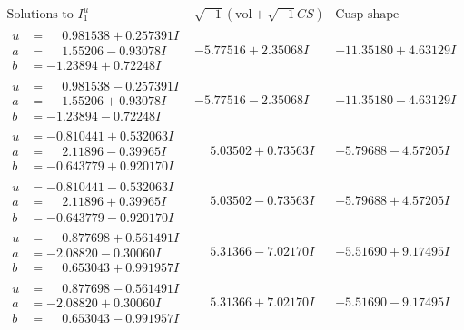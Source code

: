 \documentclass[1p]{elsarticle_modified}
\theoremstyle{definition}
\newcommand{\I}{\sqrt{-1}}
\begin{document}
$$\begin{array}{c|c|c}  
\text{Solutions to }I^u_{1}& \I (\text{vol} + \sqrt{-1}CS) & \text{Cusp shape}\\
 \hline 
\begin{aligned}
u &= \phantom{-}0.981538 + 0.257391 I \\
a &= \phantom{-}1.55206 - 0.93078 I \\
b &= -1.23894 + 0.72248 I\end{aligned}
 & -5.77516 + 2.35068 I & -11.35180 + 4.63129 I \\ \hline\begin{aligned}
u &= \phantom{-}0.981538 - 0.257391 I \\
a &= \phantom{-}1.55206 + 0.93078 I \\
b &= -1.23894 - 0.72248 I\end{aligned}
 & -5.77516 - 2.35068 I & -11.35180 - 4.63129 I \\ \hline\begin{aligned}
u &= -0.810441 + 0.532063 I \\
a &= \phantom{-}2.11896 - 0.39965 I \\
b &= -0.643779 + 0.920170 I\end{aligned}
 & \phantom{-}5.03502 + 0.73563 I & -5.79688 - 4.57205 I \\ \hline\begin{aligned}
u &= -0.810441 - 0.532063 I \\
a &= \phantom{-}2.11896 + 0.39965 I \\
b &= -0.643779 - 0.920170 I\end{aligned}
 & \phantom{-}5.03502 - 0.73563 I & -5.79688 + 4.57205 I \\ \hline\begin{aligned}
u &= \phantom{-}0.877698 + 0.561491 I \\
a &= -2.08820 - 0.30060 I \\
b &= \phantom{-}0.653043 + 0.991957 I\end{aligned}
 & \phantom{-}5.31366 - 7.02170 I & -5.51690 + 9.17495 I \\ \hline\begin{aligned}
u &= \phantom{-}0.877698 - 0.561491 I \\
a &= -2.08820 + 0.30060 I \\
b &= \phantom{-}0.653043 - 0.991957 I\end{aligned}
 & \phantom{-}5.31366 + 7.02170 I & -5.51690 - 9.17495 I \\ \hline\begin{aligned}

\end{aligned}
\end{array}$$
\end{document}
